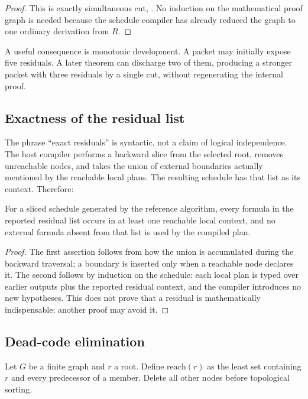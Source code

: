 \begin{proof}
This is exactly simultaneous cut, .  No induction on the mathematical proof graph is
needed because the schedule compiler has already reduced the graph to one ordinary derivation from
\(R\).
\end{proof}

A useful consequence is monotonic development.  A packet may initially expose five residuals.  A
later theorem can discharge two of them, producing a stronger packet with three residuals by a
single cut, without regenerating the internal proof.

\subsection{Exactness of the residual list}

The phrase ``exact residuals'' is syntactic, not a claim of logical independence.  The host compiler
performs a backward slice from the selected root, removes unreachable nodes, and takes the union of
external boundaries actually mentioned by the reachable local plans.  The resulting schedule has
that list as its context.  Therefore:

\begin{proposition}\label{prop:residual-exact}
For a sliced schedule generated by the reference algorithm, every formula in the reported residual
list occurs in at least one reachable local context, and no external formula absent from that list is
used by the compiled plan.
\end{proposition}

\begin{proof}
The first assertion follows from how the union is accumulated during the backward traversal; a
boundary is inserted only when a reachable node declares it.  The second follows by induction on the
schedule: each local plan is typed over earlier outputs plus the reported residual context, and the
compiler introduces no new hypotheses.  This does not prove that a residual is mathematically
indispensable; another proof may avoid it.
\end{proof}

\subsection{Dead-code elimination}

Let \(G\) be a finite graph and \(r\) a root.  Define \(\mathrm{reach}(r)\) as the least set containing
\(r\) and every predecessor of a member.  Delete all other nodes before topological sorting.

